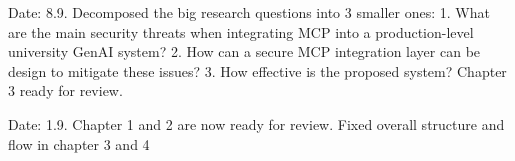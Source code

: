 
Date: 8.9.
    Decomposed the big research questions into 3 smaller ones:
        1. What are the main security threats when integrating MCP into a production-level university GenAI system?
        2. How can a secure MCP integration layer can be design to mitigate these issues?
        3. How effective is the proposed system?
    Chapter 3 ready for review.

Date: 1.9.
    Chapter 1 and 2 are now ready for review.
    Fixed overall structure and flow in chapter 3 and 4


